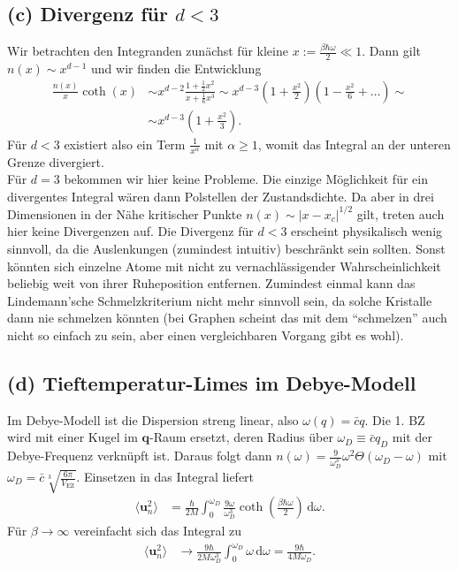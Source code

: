 \documentclass[english, parskip=full]{scrartcl}
\renewcommand{\bra}{}
\newcommand{\intx}{}
\newcommand{\kla}{}
\newcommand{\tecxt}{}
\begin{document}
\subsection*{(c) Divergenz für $d<3$}
Wir betrachten den Integranden zunächst für kleine $x := \frac{\beta\hbar\omega}{2} \ll 1$.
Dann gilt $n(x) \sim x^{d-1}$ und wir finden die Entwicklung
\begin{align}
\frac{n(x)}{x} \coth(x) &\sim x^{d-2} \frac{1 + \frac{1}{2}x^2}{x + \frac{1}{6}x^3} \sim x^{d-3} \kla\left( 1 + \frac{x^2}{2} \right) \kla\left( 1 - \frac{x^2}{6} + \dots \right) \sim \\
&\sim x^{d-3} \kla\left( 1 + \frac{x^2}{3} \right).
\end{align}
Für $d<3$ existiert also ein Term $\frac{1}{x^\alpha}$ mit $\alpha \ge 1$, womit das Integral an der unteren Grenze divergiert.
\\
Für $d=3$ bekommen wir hier keine Probleme. 
Die einzige Möglichkeit für ein divergentes Integral wären dann Polstellen der Zustandsdichte.
Da aber in drei Dimensionen in der Nähe kritischer Punkte $n(x) \sim |x - x_c|^{1/2}$ gilt, treten auch hier keine Divergenzen auf.
Die Divergenz für $d<3$ erscheint physikalisch wenig sinnvoll, da die Auslenkungen (zumindest intuitiv) beschränkt sein sollten.
Sonst könnten sich einzelne Atome mit nicht zu vernachlässigender Wahrscheinlichkeit beliebig weit von ihrer Ruheposition entfernen.
Zumindest einmal kann das Lindemann'sche Schmelzkriterium nicht mehr sinnvoll sein, da solche Kristalle dann nie schmelzen könnten (bei Graphen scheint das mit dem ``schmelzen'' auch nicht so einfach zu sein, aber einen vergleichbaren Vorgang gibt es wohl).
\subsection*{(d) Tieftemperatur-Limes im Debye-Modell}
Im Debye-Modell ist die Dispersion streng linear, also $\omega(q) = \bar{c} q$.
Die 1. BZ wird mit einer Kugel im $\textbf{q}$-Raum ersetzt, deren Radius über $\omega_D \equiv \bar{c}q_D$ mit der Debye-Frequenz verknüpft ist.
Daraus folgt dann $n(\omega) = \frac{9}{\omega_D^3}\omega^2 \Theta(\omega_D - \omega)$ mit $\omega_D=\bar{c} \sqrt[3]{\frac{6\pi}{V_\tecxt\text{EZ}}}$.
Einsetzen in das Integral liefert
\begin{align}
\bra\langle \textbf{u}_n^2 \rangle &= \frac{\hbar}{2M} \intx\int_{0}^{\omega_D} \frac{9\omega}{\omega_D^3} \coth\kla\left( \frac{\beta\hbar\omega}{2} \right) \, \mathrm{d}\omega.
\end{align}
Für $\beta \rightarrow \infty$ vereinfacht sich das Integral zu
\begin{align}
\bra\langle \textbf{u}_n^2 \rangle &\longrightarrow \frac{9\hbar}{2M\omega_D^3} \intx\int_{0}^{\omega_D}\omega \, \mathrm{d}\omega = \frac{9\hbar}{4M\omega_D}.
\end{align}
\end{document}
